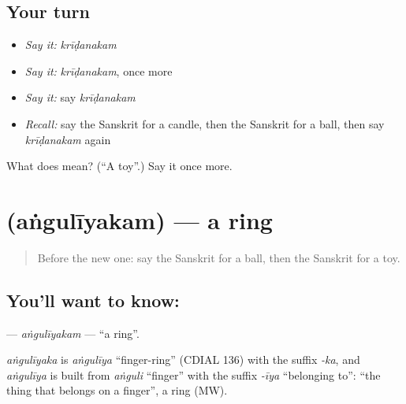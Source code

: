 \subsection*{Your turn}
\begin{itemize}
\raggedright
  \item \emph{Say it:} \emph{krīḍanakam}
  \item \emph{Say it:} \emph{krīḍanakam}, once more
  \item \emph{Say it:} say \emph{krīḍanakam}
  \item \emph{Recall:} say the Sanskrit for a candle, then the Sanskrit for a ball, then say \emph{krīḍanakam} again
\end{itemize}

\begin{tcolorbox}[breakable,colback=teal!4,colframe=teal!35!black,title={Before you move on}]
What does  mean? (\textquotedblleft{}A toy\textquotedblright{}.) Say it once more.
\end{tcolorbox}
\section[\texorpdfstring{\sk{अंगुलीयकम्} (aṅgulīyakam)}{अंगुलीयकम् (aṅgulīyakam)}]{ (aṅgulīyakam) — a ring}

\label{lesson:SA-C103-anguliyakam}



\begin{quote}
Before the new one: say the Sanskrit for a ball, then the Sanskrit for a toy.
\end{quote}

\subsection*{You'll want to know: }
\textbf{} — \emph{aṅgulīyakam} — \textquotedblleft{}a ring\textquotedblright{}.

\begin{cousinweb}
\emph{aṅgulīyaka} is \emph{aṅgulīya} \textquotedblleft{}finger-ring\textquotedblright{} (CDIAL 136) with the suffix \emph{-ka}, and \emph{aṅgulīya} is built from \emph{aṅguli} \textquotedblleft{}finger\textquotedblright{} with the suffix \emph{-īya} \textquotedblleft{}belonging to\textquotedblright{}: \textquotedblleft{}the thing that belongs on a finger\textquotedblright{}, a ring (MW).
\end{cousinweb}

